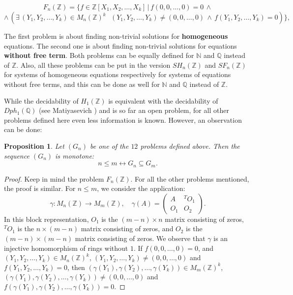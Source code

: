 \documentclass{article}
\theoremstyle{plain}
\newtheorem{proposition}{Proposition}[section]
\theoremstyle{definition}
\begin{document}
$$ F_n(\mathbb Z) = \{ f \in \mathbb Z[X_1, X_2, \dots, X_k]\,|\,f(0, 0, \dots, 0) = 0 \,\wedge  $$ $$ \wedge \, \left (\exists \,(Y_1, Y_2, \dots, Y_k) \in M_n(\mathbb Z)^k\,\,\,\,(Y_1, Y_2, \dots, Y_k) \neq (0, 0, \dots, 0) \,\wedge \, f(Y_1, Y_2, \dots, Y_k) = 0 \right )\}, $$ 

The first problem is about finding non-trivial solutions for {\bf homogeneous}  equations. The second one is about finding non-trivial solutions for equations {\bf without free term}. Both problems can be equally defined for $\mathbb N$ and $\mathbb Q$ instead of $\mathbb Z$. Also, all these problems can be put in the version $SH_n(\mathbb Z)$ and $SF_n(\mathbb Z)$ for systems of homogeneous equations respectively for systems of equations without free terms, and this can be done as well for  $\mathbb N$ and $\mathbb Q$ instead of $\mathbb Z$. 

While the decidability of $H_1(\mathbb Z)$ is equivalent with the decidability of $Dph_1(\mathbb Q)$ (see Matiyasevich \cite{Matiyasevich}) and is so far an open problem, for all other problems defined here even less information is known. However, an observation can be done:

\begin{proposition}
Let $( G_n )$ be one of the $12$ problems defined above. Then the sequence $( G_n )$ is monotone:
$$ n \leq m \longleftrightarrow G_n \subseteq G_m .$$
\end{proposition}

\begin{proof}
Keep in mind the problem $F_n(\mathbb Z)$. For all the other problems mentioned, the proof is similar. For $n \leq m$, we consider the application:
$$\gamma : M_n(\mathbb Z) \rightarrow M_m(\mathbb Z), \,\,\,\,\,\, \gamma(A) = \begin{pmatrix} A & ^T O_1 \\ O_1 & O_2 \end{pmatrix}.$$
In this block representation, $O_1$ is the $(m-n) \times n$ matrix consisting of zeros, $^T O_1$ is the $n \times (m-n)$ matrix consisting of zeros, and $O_2$ is the $(m-n) \times (m-n)$ matrix consisting of zeros. We observe that $\gamma$ is an injective homomorphism of rings without $1$. If $f(0, 0, \dots, 0) = 0$, and $(Y_1, Y_2, \dots, Y_k) \in M_n(\mathbb Z)^k$, $(Y_1, Y_2, \dots, Y_k) \neq (0,0,\dots , 0)$ and $f(Y_1, Y_2, \dots, Y_k) =0$, then $(\gamma(Y_1), \gamma( Y_2), \dots, \gamma(Y_k) )  \in M_m(\mathbb Z)^k$, $(\gamma(Y_1), \gamma( Y_2), \dots, \gamma(Y_k) )  \neq (0,0,\dots , 0)$ and $f(\gamma(Y_1), \gamma( Y_2), \dots, \gamma(Y_k) )  = 0$. 
\end{proof}
\end{document}
